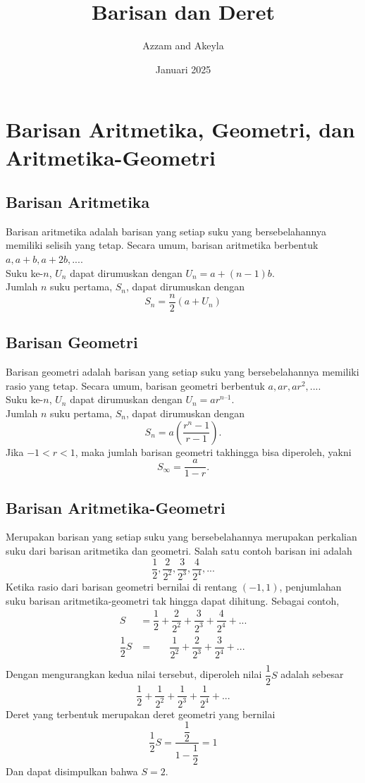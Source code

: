 \documentclass[11pt]{scrartcl}
\title{Barisan dan Deret}
\author{Azzam and Akeyla}
\date{Januari 2025}
\begin{document}
\maketitle

\renewcommand*\contentsname{Daftar Isi}
\tableofcontents

\newpage
\section{Barisan Aritmetika, Geometri, dan Aritmetika-Geometri}
\subsection{Barisan Aritmetika}
Barisan aritmetika adalah barisan yang setiap suku yang bersebelahannya memiliki selisih yang tetap. Secara umum, barisan aritmetika berbentuk $a, a + b, a + 2b, ...$.\\
Suku ke-$n$, $U_n$ dapat dirumuskan dengan $U_n  = a + (n-1)b$.\\
Jumlah $n$ suku pertama, $S_n$, dapat dirumuskan dengan
\[S_n  = \dfrac{n}{2} (a + U_n )\]

\subsection{Barisan Geometri}
Barisan geometri adalah barisan yang setiap suku yang bersebelahannya memiliki rasio yang tetap. Secara umum, barisan geometri berbentuk $a,ar,ar^2, ...$.\\
Suku ke-$n$, $U_n$ dapat dirumuskan dengan $U_n = ar^{n – 1}$.\\
Jumlah $n$ suku pertama, $S_n$, dapat dirumuskan dengan \[S_n  = a\left(\dfrac{r^n - 1}{r - 1}\right).\]
Jika $-1<r<1$, maka jumlah barisan geometri takhingga bisa diperoleh, yakni
\[S_\infty = \dfrac{a}{1 - r}.\]

\subsection{Barisan Aritmetika-Geometri}
Merupakan barisan yang setiap suku yang bersebelahannya merupakan perkalian suku dari barisan aritmetika dan geometri. Salah satu contoh barisan ini adalah \[\dfrac{1}{2}, \dfrac{2}{2^2}, \dfrac{3}{2^3}, \dfrac{4}{2^4}, ...\]
Ketika rasio dari barisan geometri bernilai di rentang $(-1, 1)$, penjumlahan suku barisan aritmetika-geometri tak hingga dapat dihitung. Sebagai contoh,
\begin{align*}
    S &= \dfrac{1}{2} + \dfrac{2}{2^2} + \dfrac{3}{2^3} + \dfrac{4}{2^4} + ... \\
    \dfrac{1}{2}S &= \hspace{20pt} \dfrac{1}{2^2} + \dfrac{2}{2^3} + \dfrac{3}{2^4} + ... \\
\end{align*}
Dengan mengurangkan kedua nilai tersebut, diperoleh nilai $\dfrac{1}{2}S$ adalah sebesar \[\dfrac{1}{2} + \dfrac{1}{2^2} + \dfrac{1}{2^3} + \dfrac{1}{2^4} + ...\]
Deret yang terbentuk merupakan deret geometri yang bernilai \[\dfrac{1}{2}S = \dfrac{\dfrac{1}{2}}{1 - \dfrac{1}{2}} = 1\]
Dan dapat disimpulkan bahwa $S = 2$.
\end{document}
